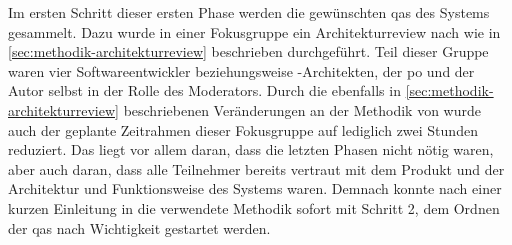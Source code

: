 Im ersten Schritt dieser ersten Phase werden die gewünschten \glspl{qa} des Systems gesammelt.
Dazu wurde in einer Fokusgruppe ein Architekturreview nach  wie in \cref{sec:methodik-architekturreview} beschrieben durchgeführt.
Teil dieser Gruppe waren vier Softwareentwickler beziehungsweise -Architekten, der \acrlong{po} und der Autor selbst in der Rolle des Moderators.
Durch die ebenfalls in \cref{sec:methodik-architekturreview} beschriebenen Veränderungen an der Methodik von  wurde auch der geplante Zeitrahmen dieser Fokusgruppe auf lediglich zwei Stunden reduziert. Das liegt vor allem daran, dass die letzten Phasen nicht nötig waren, aber auch daran, dass alle Teilnehmer bereits vertraut mit dem Produkt und der Architektur und Funktionsweise des Systems waren.
Demnach konnte nach einer kurzen Einleitung in die verwendete Methodik sofort mit Schritt 2, dem Ordnen der \glspl{qa} nach Wichtigkeit gestartet werden.

